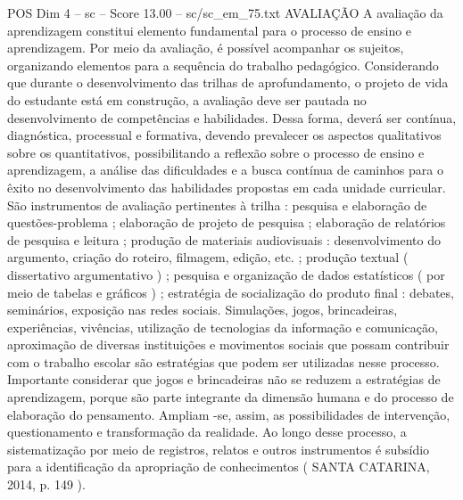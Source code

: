 \begin{textsample}{POS Dim 4 – sc – Score 13.00 – sc/sc\_em\_75.txt}
AVALIAÇÃO A avaliação da aprendizagem constitui elemento fundamental para o processo de ensino e aprendizagem.
Por meio da avaliação, é possível acompanhar os sujeitos, organizando elementos para a sequência do trabalho pedagógico.
Considerando que durante o desenvolvimento das trilhas de aprofundamento, o projeto de vida do estudante está em construção, a avaliação deve ser pautada no desenvolvimento de competências e habilidades.
Dessa forma, deverá ser contínua, diagnóstica, processual e formativa, devendo prevalecer os aspectos qualitativos sobre os quantitativos, possibilitando a reflexão sobre o processo de ensino e aprendizagem, a análise das dificuldades e a busca contínua de caminhos para o êxito no desenvolvimento das habilidades propostas em cada unidade curricular.
São instrumentos de avaliação pertinentes à trilha : pesquisa e elaboração de questões-problema ; elaboração de projeto de pesquisa ; elaboração de relatórios de pesquisa e leitura ; produção de materiais audiovisuais : desenvolvimento do argumento, criação do roteiro, filmagem, edição, etc. ; produção textual ( dissertativo argumentativo ) ; pesquisa e organização de dados estatísticos ( por meio de tabelas e gráficos ) ; estratégia de socialização do produto final : debates, seminários, exposição nas redes sociais.
Simulações, jogos, brincadeiras, experiências, vivências, utilização de tecnologias da informação e comunicação, aproximação de diversas instituições e movimentos sociais que possam contribuir com o trabalho escolar são estratégias que podem ser utilizadas nesse processo.
Importante considerar que jogos e brincadeiras não se reduzem a estratégias de aprendizagem, porque são parte integrante da dimensão humana e do processo de elaboração do pensamento.
Ampliam -se, assim, as possibilidades de intervenção, questionamento e transformação da realidade.
Ao longo desse processo, a sistematização por meio de registros, relatos e outros instrumentos é subsídio para a identificação da apropriação de conhecimentos ( SANTA CATARINA, 2014, p. 149 ).

\end{textsample}
